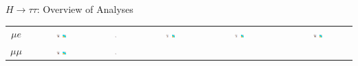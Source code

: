 \documentclass{beamer}
\begin{document}
\begin{frame}{$H \rightarrow \tau \tau$: Overview of Analyses}
\begin{table}
\begin{tabular}{c | c | c | c | c | c | c}
			 
			\hline		
			$\mu e$ &
			\includegraphics[width=0.05\textwidth]{figures/atlas_logo.pdf} \includegraphics[width=0.05\textwidth]{figures/cms_logo.pdf} &
			\includegraphics[width=0.05\textwidth]{figures/atlas_logo.pdf} &
			\includegraphics[width=0.05\textwidth]{figures/atlas_logo.pdf} \includegraphics[width=0.05\textwidth]{figures/cms_logo.pdf}&
			\includegraphics[width=0.05\textwidth]{figures/atlas_logo.pdf} \includegraphics[width=0.05\textwidth]{figures/cms_logo.pdf} &
			&
			\includegraphics[width=0.05\textwidth]{figures/atlas_logo.pdf} \includegraphics[width=0.05\textwidth]{figures/cms_logo.pdf} 	
			\\
			$\mu\mu$ &
			\includegraphics[width=0.05\textwidth]{figures/atlas_logo.pdf} \includegraphics[width=0.05\textwidth]{figures/cms_logo.pdf} &
			\includegraphics[width=0.05\textwidth]{figures/atlas_logo.pdf} &

\end{tabular}
\end{table}
\end{frame}
\end{document}
